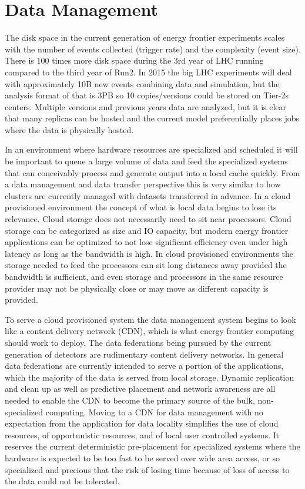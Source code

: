 \section{Data Management}
\label{sec:comp-dm}


The disk space in the current generation of energy frontier experiments scales with the number of events collected (trigger rate) and the complexity (event size).   There is 100 times more disk space during the 3rd year of LHC running compared to the third year of Run2.   In 2015 the big LHC experiments will deal with approximately 10B new events combining data and simulation, but the analysis format of that is 3PB so 10 copies/versions could be stored on Tier-2s centers.     Multiple versions and previous years data are analyzed, but it is clear that many replicas can be hosted and the current model preferentially places jobs where the data is physically hosted.

In an environment where hardware resources are specialized and scheduled it will be important to queue a large volume of data and feed the specialized systems that can conceivably process and generate output into a local cache quickly.   From a data management and data transfer perspective this is very similar to how clusters are currently managed with datasets transferred in advance.    In a cloud provisioned environment the concept of what is local data begins to lose its relevance.    Cloud storage does not necessarily need to sit near processors.   Cloud storage can be categorized as size and IO capacity, but modern energy frontier applications can be optimized to not lose significant efficiency even under high latency as long as the bandwidth is high.    In cloud provisioned environments the storage needed to feed the processors can sit long distances away provided the bandwidth is sufficient, and even storage and processors in the same resource provider may not be physically close or may move as different capacity is provided.   

To serve a cloud provisioned system the data management system begins to look like a content delivery network (CDN), which is what energy frontier computing should work to deploy.   The data federations being pursued by the current generation of detectors are rudimentary content delivery networks.    In general data federations are currently intended to serve a portion of the applications, which the majority of the data is served from local storage.   Dynamic replication and clean up as well as predictive placement and network awareness are all needed to enable the CDN to become the primary source of the bulk, non-specialized computing.    Moving to a CDN for data management with no expectation from the application for data locality simplifies the use of cloud resources, of opportunistic resources, and of local user controlled systems.    It reserves the current deterministic pre-placement for specialized systems where the hardware is expected to be too fast to be served over wide area access, or so specialized and precious that the risk of losing time because of loss of access to the data could not be tolerated.   

